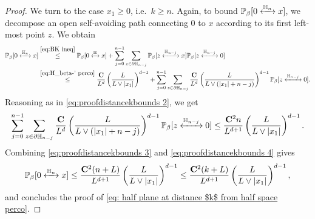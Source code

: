 \documentclass[11pt,a4paper]{article}
\numberwithin{equation}{section}
\theoremstyle{plain}
\theoremstyle{definition}
\newcommand\bfC{\mathbf{C}}
\newcommand{\connect}{\xleftrightarrow}
\begin{document}
\begin{proof}
  We turn to the case $x_1\geq 0$, i.e.\ $k\geq n$. Again, to bound $\mathbb P_\beta[0\connect{\mathbb H_n\:}x]$, we decompose an open self-avoiding path connecting $0$ to $x$ according to its first left-most point $z$. We obtain
\begin{align}\label{eq: bound distance k 1 bis}
  	\mathbb P_{\beta}[0\connect{\mathbb H_n\:}x]&\stackrel{\eqref{eq:BK ineq}}\leq \mathbb P_{\beta}[0\connect{\mathbb H\:}x]+\sum_{j=0}^{n-1}\sum_{\substack{z\in \partial \mathbb H_{n-j}}}\mathbb P_\beta[z\connect{\mathbb H_{n-j}\:}x]\mathbb P_\beta[z\connect{\mathbb H_{n-j}\:}0]
  	\\&\stackrel{\eqref{eq:H_beta-' perco}}\leq \frac{\bfC}{L^d}\left(\frac{L}{L\vee |x_1|}\right)^{d-1}+\sum_{j=0}^{n-1}\sum_{\substack{z\in \partial \mathbb H_{n-j}}}\frac{\bfC}{L^d}\left(\frac{L}{L\vee (|x_1|+n-j)}\right)^{d-1} 	\mathbb P_\beta[z\connect{\mathbb H_{n-j}\:}0]. \label{eq:proofdistancekbounds 3}
  \end{align}
 Reasoning as in \eqref{eq:proofdistancekbounds 2}, we get
  \begin{equation}\label{eq:proofdistancekbounds 4}
  	\sum_{j=0}^{n-1}\sum_{\substack{z\in \partial \mathbb H_{n-j}}}\frac{\bfC}{L^d}\left(\frac{L}{L\vee (|x_1|+n-j)}\right)^{d-1} 	\mathbb P_\beta[z\connect{\mathbb H_{n-j}\:}0]\leq \frac{\bfC^2 n}{L^{d+1}}\left(\frac{L}{L\vee |x_1|}\right)^{d-1}.
  \end{equation}
 Combining \eqref{eq:proofdistancekbounds 3} and \eqref{eq:proofdistancekbounds 4} gives
 \begin{equation}
 	\mathbb P_\beta[0\connect{\mathbb H_n\:}x]\leq \frac{\bfC^2(n+L)}{L^{d+1}}\left(\frac{L}{L\vee |x_1|}\right)^{d-1}\leq \frac{\bfC^2(k+L)}{L^{d+1}}\left(\frac{L}{L\vee |x_1|}\right)^{d-1},
 \end{equation}
 and concludes the proof of \eqref{eq: half plane at distance $k$ from half space perco}. 
 

  

\end{proof}
\end{document}
